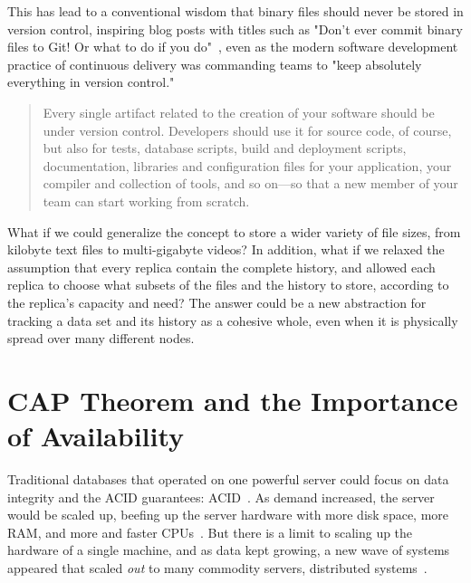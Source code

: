 This has lead to a conventional wisdom that binary files should never be stored
in version control, inspiring blog posts with titles such as "Don't ever commit
binary files to Git! Or what to do if you
do"~\cite{dont_ever_commit_binaries_to_version_control}, even as the modern
software development practice of continuous delivery was commanding teams to
"keep absolutely everything in version
control."~\cite[p.33]{continuousdeliverybook}

\blockcquote[p.33]{continuousdeliverybook}{
    Every single artifact related to the creation of your software should be
    under version control. Developers should use it for source code, of course,
    but also for tests, database scripts, build and deployment scripts,
    documentation, libraries and configuration files for your application, your
    compiler and collection of tools, and so on---so that a new member of your
    team can start working from scratch.
}

What if we could generalize the 
concept to store a wider variety of file sizes, from kilobyte text files to
multi-gigabyte videos? In addition, what if we relaxed the assumption that every
replica contain the complete history, and allowed each replica to choose what
subsets of the files and the history to store, according to the replica's
capacity and need? The answer could be a new abstraction for tracking a data set
and its history as a cohesive whole, even when it is physically spread over many
different nodes.

%



\section{CAP Theorem and the Importance of Availability}


Traditional databases that operated on one powerful server could focus on data
integrity and the \acrshort{ACID} guarantees: \acrlong{ACID}~\cite[Chapter
1]{nosqldistilled}. As demand increased, the server would be scaled up, beefing
  up the server hardware with more disk space, more RAM, and more and faster
  CPUs~\cite[Chapter 4]{nosqldistilled}. But there is a limit to scaling up the
  hardware of a single machine, and as data kept growing, a new wave of systems
  appeared that scaled \emph{out} to many commodity servers, distributed
  systems~\cite[Chapter 4]{nosqldistilled}.

